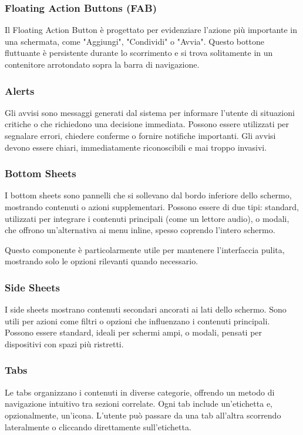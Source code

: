 \subsubsection{Floating Action Buttons (FAB)}
Il Floating Action Button è progettato per evidenziare l'azione più importante in una schermata, come "Aggiungi", "Condividi" o "Avvia". Questo bottone fluttuante è persistente durante lo scorrimento e si trova solitamente in un contenitore arrotondato sopra la barra di navigazione.

\subsubsection{Alerts}
Gli avvisi sono messaggi generati dal sistema per informare l'utente di situazioni critiche o che richiedono una decisione immediata. Possono essere utilizzati per segnalare errori, chiedere conferme o fornire notifiche importanti.
Gli avvisi devono essere chiari, immediatamente riconoscibili e mai troppo invasivi.

\subsubsection{Bottom Sheets}
I bottom sheets sono pannelli che si sollevano dal bordo inferiore dello schermo, mostrando contenuti o azioni supplementari. Possono essere di due tipi: standard, utilizzati per integrare i contenuti principali (come un lettore audio), o modali, che offrono un’alternativa ai menu inline, spesso coprendo l’intero schermo.

Questo componente è particolarmente utile per mantenere l'interfaccia pulita, mostrando solo le opzioni rilevanti quando necessario.

\subsubsection{Side Sheets}
I side sheets mostrano contenuti secondari ancorati ai lati dello schermo. Sono utili per azioni come filtri o opzioni che influenzano i contenuti principali. Possono essere standard, ideali per schermi ampi, o modali, pensati per dispositivi con spazi più ristretti.

\subsubsection{Tabs}
Le tabs organizzano i contenuti in diverse categorie, offrendo un metodo di navigazione intuitivo tra sezioni correlate. Ogni tab include un'etichetta e, opzionalmente, un’icona. L’utente può passare da una tab all’altra scorrendo lateralmente o cliccando direttamente sull’etichetta.

